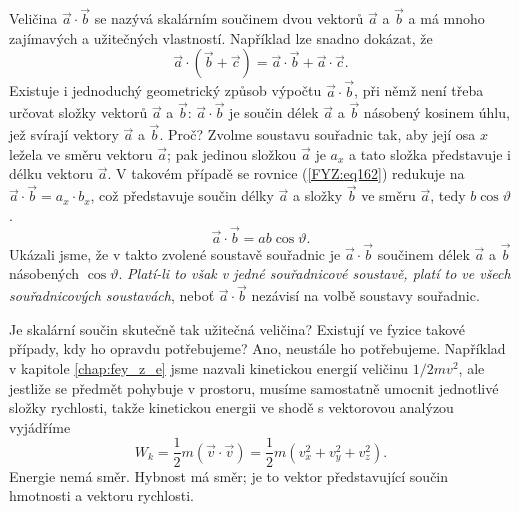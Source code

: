 {{    Veličina \(\vec{a}\cdot\vec{b}\) se nazývá skalárním součinem dvou vektorů \(\vec{a}\) a 
    \(\vec{b}\) a má mnoho zajímavých a užitečných vlastností. Například lze snadno dokázat, že
    \begin{equation}\label{FYZ:eq164}
      \vec{a}\cdot(\vec{b} + \vec{c}) =  \vec{a}\cdot\vec{b} + \vec{a}\cdot\vec{c}.
    \end{equation}
    Existuje i jednoduchý geometrický způsob výpočtu \(\vec{a}\cdot\vec{b}\), při němž není třeba 
    určovat složky vektorů \(\vec{a}\) a \(\vec{b}\): \(\vec{a}\cdot\vec{b}\) je součin délek 
    \(\vec{a}\) a \(\vec{b}\) násobený kosinem úhlu, jež svírají vektory \(\vec{a}\) a \(\vec{b}\). 
    Proč? Zvolme soustavu souřadnic tak, aby její osa \(x\) ležela ve směru vektoru \(\vec{a}\); 
    pak jedinou složkou \(\vec{a}\) je \(a_x\) a tato složka představuje i délku vektoru 
    \(\vec{a}\). V takovém případě se rovnice (\ref{FYZ:eq162}) redukuje na \(\vec{a}\cdot\vec{b} = 
    a_x\cdot b_x\), což představuje součin délky \(\vec{a}\) a složky \(\vec{b}\) ve směru 
    \(\vec{a}\), tedy \(b\cos\vartheta\).
    \begin{equation*}
      \vec{a}\cdot\vec{b} = ab\cos\vartheta.
    \end{equation*}
    Ukázali jsme, že v takto zvolené soustavě souřadnic je \(\vec{a}\cdot\vec{b}\) součinem délek 
    \(\vec{a}\) a \(\vec{b}\) násobených \(\cos\vartheta\). \emph{Platí-li to však v jedné 
    souřadnicové soustavě, platí to ve všech souřadnicových soustavách}, neboť 
    \(\vec{a}\cdot\vec{b}\) nezávisí na volbě soustavy souřadnic.
    
    Je skalární součin skutečně tak užitečná veličina? Existují ve fyzice takové případy, kdy ho 
    opravdu potřebujeme? Ano, neustále ho potřebujeme. Například v kapitole \ref{chap:fey_z_e} jsme 
    nazvali kinetickou energií veličinu \(1/2 mv^2\), ale jestliže se předmět pohybuje v prostoru, 
    musíme samostatně umocnit jednotlivé složky rychlosti, takže kinetickou energii ve shodě s 
    vektorovou analýzou vyjádříme
    \begin{equation}\label{FYZ:eq165}
      W_k = \frac{1}{2}m(\vec{v}\cdot\vec{v}) = \frac{1}{2}m(v_x^2 + v_y^2 + v_z^2).
    \end{equation}
    Energie nemá směr. Hybnost má směr; je to vektor představující součin hmotnosti a vektoru rychlosti.
    
}}
